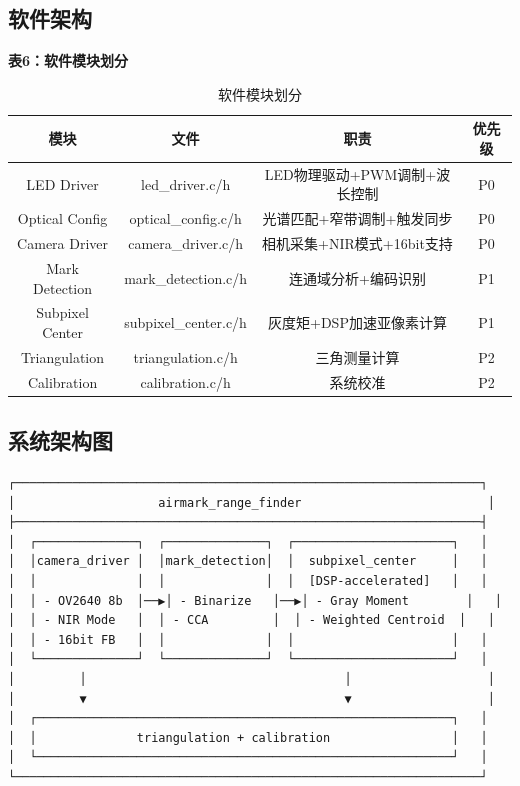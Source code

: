 \documentclass[12pt, a4paper]{ctexart}
\begin{document}
\subsection{软件架构}

\textbf{表6：软件模块划分}

\begin{table}[htbp]
\centering
\caption{软件模块划分}
\begin{tabular}{cccc}
\toprule
模块 & 文件 & 职责 & 优先级 \\
\midrule
LED Driver & led\_driver.c/h & LED物理驱动+PWM调制+波长控制 & P0 \\
Optical Config & optical\_config.c/h & 光谱匹配+窄带调制+触发同步 & P0 \\
Camera Driver & camera\_driver.c/h & 相机采集+NIR模式+16bit支持 & P0 \\
Mark Detection & mark\_detection.c/h & 连通域分析+编码识别 & P1 \\
Subpixel Center & subpixel\_center.c/h & 灰度矩+DSP加速亚像素计算 & P1 \\
Triangulation & triangulation.c/h & 三角测量计算 & P2 \\
Calibration & calibration.c/h & 系统校准 & P2 \\
\bottomrule
\end{tabular}
\end{table}

\subsection{系统架构图}

\begin{verbatim}
┌─────────────────────────────────────────────────────────────────┐
│                    airmark_range_finder                          │
├─────────────────────────────────────────────────────────────────┤
│  ┌──────────────┐  ┌──────────────┐  ┌──────────────────────┐   │
│  │camera_driver │  │mark_detection│  │  subpixel_center     │   │
│  │              │  │              │  │  [DSP-accelerated]   │   │
│  │ - OV2640 8b  │──▶│ - Binarize   │──▶│ - Gray Moment        │   │
│  │ - NIR Mode   │  │ - CCA         │  │ - Weighted Centroid  │   │
│  │ - 16bit FB   │  │              │  │                      │   │
│  └──────────────┘  └──────────────┘  └──────────────────────┘   │
│         │                                    │                   │
│         ▼                                    ▼                   │
│  ┌──────────────────────────────────────────────────────────┐   │
│  │              triangulation + calibration                 │   │
│  └──────────────────────────────────────────────────────────┘   │
└─────────────────────────────────────────────────────────────────┘
\end{verbatim}
\end{document}
